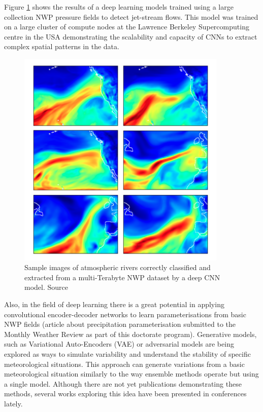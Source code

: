 \medskip

Figure \ref{deep_clasif} shows the results of a deep learning models trained using a large collection NWP pressure fields to detect jet-stream flows. This model was trained on a large cluster of compute nodes at the Lawrence Berkeley Supercomputing centre in the USA demonstrating the scalability and capacity of CNNs to extract complex spatial patterns in the data.

\medskip

\begin{figure}[h]
 \centerline{\includegraphics[width=10cm]{deep_classif.png}} \caption{Sample images of atmospheric rivers correctly classified and extracted from a multi-Terabyte NWP dataset by a deep CNN model. Source \citep{liu2016application}}\label{deep_clasif}
\end{figure}

Also, in the field of deep learning there is a great potential in applying convolutional encoder-decoder networks to learn parameterisations from basic NWP fields (article about precipitation parameterisation submitted to the Monthly Weather Review as part of this doctorate program). Generative models, such as Variational Auto-Encoders (VAE) \citep{kingma2013vae} or adversarial models \citep{goodfellow2014gan} are being explored as ways to simulate variability and understand the stability of specific meteorological situations. This approach can generate variations from a basic meteorological situation similarly to the way ensemble methods operate but using a single model. Although there are not yet publications demonstrating these methods, several works exploring this idea have been presented in conferences lately.

